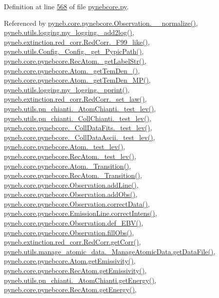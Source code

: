 Definition at line \hyperlink{pynebcore_8py_source_l00568}{568} of file \hyperlink{pynebcore_8py_source}{pynebcore.\+py}.



Referenced by \hyperlink{pynebcore_8py_source_l03885}{pyneb.\+core.\+pynebcore.\+Observation.\+\_\+\+\_\+normalize()}, \hyperlink{logging_8py_source_l00059}{pyneb.\+utils.\+logging.\+my\+\_\+logging.\+\_\+add2log()}, \hyperlink{red__corr_8py_source_l00658}{pyneb.\+extinction.\+red\+\_\+corr.\+Red\+Corr.\+\_\+\+F99\+\_\+like()}, \hyperlink{_config_8py_source_l00086}{pyneb.\+utils.\+Config.\+\_\+\+Config.\+\_\+get\+\_\+\+Pypic\+Path()}, \hyperlink{pynebcore_8py_source_l02854}{pyneb.\+core.\+pynebcore.\+Rec\+Atom.\+\_\+get\+Label\+Str()}, \hyperlink{pynebcore_8py_source_l01803}{pyneb.\+core.\+pynebcore.\+Atom.\+\_\+get\+Tem\+Den\+\_()}, \hyperlink{pynebcore_8py_source_l01980}{pyneb.\+core.\+pynebcore.\+Atom.\+\_\+get\+Tem\+Den\+\_\+\+M\+P()}, \hyperlink{logging_8py_source_l00051}{pyneb.\+utils.\+logging.\+my\+\_\+logging.\+\_\+pprint()}, \hyperlink{red__corr_8py_source_l00176}{pyneb.\+extinction.\+red\+\_\+corr.\+Red\+Corr.\+\_\+set\+\_\+law()}, \hyperlink{pn__chianti_8py_source_l00284}{pyneb.\+utils.\+pn\+\_\+chianti.\+\_\+\+Atom\+Chianti.\+\_\+test\+\_\+lev()}, \hyperlink{pn__chianti_8py_source_l00449}{pyneb.\+utils.\+pn\+\_\+chianti.\+\_\+\+Coll\+Chianti.\+\_\+test\+\_\+lev()}, \hyperlink{pynebcore_8py_source_l00660}{pyneb.\+core.\+pynebcore.\+\_\+\+Coll\+Data\+Fits.\+\_\+test\+\_\+lev()}, \hyperlink{pynebcore_8py_source_l01026}{pyneb.\+core.\+pynebcore.\+\_\+\+Coll\+Data\+Ascii.\+\_\+test\+\_\+lev()}, \hyperlink{pynebcore_8py_source_l01459}{pyneb.\+core.\+pynebcore.\+Atom.\+\_\+test\+\_\+lev()}, \hyperlink{pynebcore_8py_source_l02596}{pyneb.\+core.\+pynebcore.\+Rec\+Atom.\+\_\+test\+\_\+lev()}, \hyperlink{pynebcore_8py_source_l01367}{pyneb.\+core.\+pynebcore.\+Atom.\+\_\+\+Transition()}, \hyperlink{pynebcore_8py_source_l02696}{pyneb.\+core.\+pynebcore.\+Rec\+Atom.\+\_\+\+Transition()}, \hyperlink{pynebcore_8py_source_l03436}{pyneb.\+core.\+pynebcore.\+Observation.\+add\+Line()}, \hyperlink{pynebcore_8py_source_l03467}{pyneb.\+core.\+pynebcore.\+Observation.\+add\+Obs()}, \hyperlink{pynebcore_8py_source_l03906}{pyneb.\+core.\+pynebcore.\+Observation.\+correct\+Data()}, \hyperlink{pynebcore_8py_source_l03325}{pyneb.\+core.\+pynebcore.\+Emission\+Line.\+correct\+Intens()}, \hyperlink{pynebcore_8py_source_l03861}{pyneb.\+core.\+pynebcore.\+Observation.\+def\+\_\+\+E\+B\+V()}, \hyperlink{pynebcore_8py_source_l03452}{pyneb.\+core.\+pynebcore.\+Observation.\+fill\+Obs()}, \hyperlink{red__corr_8py_source_l00211}{pyneb.\+extinction.\+red\+\_\+corr.\+Red\+Corr.\+get\+Corr()}, \hyperlink{manage__atomic__data_8py_source_l00297}{pyneb.\+utils.\+manage\+\_\+atomic\+\_\+data.\+\_\+\+Manage\+Atomic\+Data.\+get\+Data\+File()}, \hyperlink{pynebcore_8py_source_l01716}{pyneb.\+core.\+pynebcore.\+Atom.\+get\+Emissivity()}, \hyperlink{pynebcore_8py_source_l02873}{pyneb.\+core.\+pynebcore.\+Rec\+Atom.\+get\+Emissivity()}, \hyperlink{pn__chianti_8py_source_l00346}{pyneb.\+utils.\+pn\+\_\+chianti.\+\_\+\+Atom\+Chianti.\+get\+Energy()}, \hyperlink{pynebcore_8py_source_l02811}{pyneb.\+core.\+pynebcore.\+Rec\+Atom.\+get\+Energy()}, 